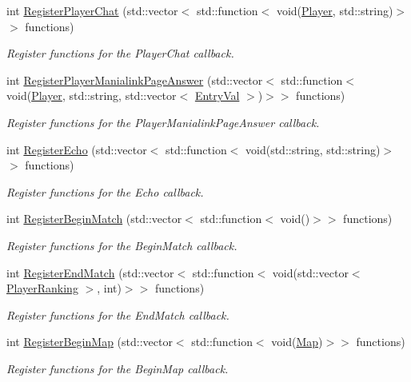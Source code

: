 \begin{DoxyCompactItemize}
int \hyperlink{classEventManager_a05a0b5a63f308f3b948b4eaa132825e3}{Register\-Player\-Chat} (std\-::vector$<$ std\-::function$<$ void(\hyperlink{structPlayer}{Player}, std\-::string)$>$$>$ functions)
\begin{DoxyCompactList}\small\item\em Register functions for the Player\-Chat callback. \end{DoxyCompactList}\item 
int \hyperlink{classEventManager_a5213c8526941c4a67b08d080302dc6bc}{Register\-Player\-Manialink\-Page\-Answer} (std\-::vector$<$ std\-::function$<$ void(\hyperlink{structPlayer}{Player}, std\-::string, std\-::vector$<$ \hyperlink{structEntryVal}{Entry\-Val} $>$)$>$$>$ functions)
\begin{DoxyCompactList}\small\item\em Register functions for the Player\-Manialink\-Page\-Answer callback. \end{DoxyCompactList}\item 
int \hyperlink{classEventManager_aee6fe2f94e1c86af6ec79735771701d0}{Register\-Echo} (std\-::vector$<$ std\-::function$<$ void(std\-::string, std\-::string)$>$$>$ functions)
\begin{DoxyCompactList}\small\item\em Register functions for the Echo callback. \end{DoxyCompactList}\item 
int \hyperlink{classEventManager_afb7b0d6fd646ce3eb0568c95c8a4b89c}{Register\-Begin\-Match} (std\-::vector$<$ std\-::function$<$ void()$>$$>$ functions)
\begin{DoxyCompactList}\small\item\em Register functions for the Begin\-Match callback. \end{DoxyCompactList}\item 
int \hyperlink{classEventManager_a3d109b973ec50e1a06475b86f005f345}{Register\-End\-Match} (std\-::vector$<$ std\-::function$<$ void(std\-::vector$<$ \hyperlink{structPlayerRanking}{Player\-Ranking} $>$, int)$>$$>$ functions)
\begin{DoxyCompactList}\small\item\em Register functions for the End\-Match callback. \end{DoxyCompactList}\item 
int \hyperlink{classEventManager_ae77dfbbb9640ca9aa5b458d6959676ea}{Register\-Begin\-Map} (std\-::vector$<$ std\-::function$<$ void(\hyperlink{structMap}{Map})$>$$>$ functions)
\begin{DoxyCompactList}\small\item\em Register functions for the Begin\-Map callback. \end{DoxyCompactList}\item 

\end{DoxyCompactItemize}
